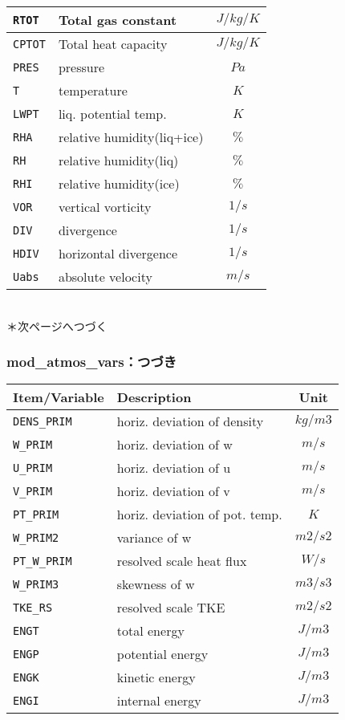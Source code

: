 \begin{tabularx}{150mm}{|l|X|c|}
  \verb|RTOT|   &  Total gas constant        & $J/kg/K$ \\\hline
  \verb|CPTOT|  &  Total heat capacity       & $J/kg/K$ \\\hline
  \verb|PRES|   &  pressure                  & $Pa$    \\\hline
  \verb|T|      &  temperature               & $K$     \\\hline
  \verb|LWPT|   &  liq. potential temp.      & $K$     \\\hline
  \verb|RHA|    &  relative humidity(liq+ice) & $\%$     \\\hline
  \verb|RH|     &  relative humidity(liq)     & $\%$     \\\hline
  \verb|RHI|    &  relative humidity(ice)     & $\%$     \\\hline
  \verb|VOR|    &  vertical vorticity        &  $1/s$   \\\hline
  \verb|DIV|    &  divergence                &  $1/s$   \\\hline
  \verb|HDIV|   &  horizontal divergence     &  $1/s$   \\\hline
  \verb|Uabs|   &  absolute velocity         &  $m/s$   \\\hline
 \end{tabularx}
　\\
\indent ＊次ページへつづく

\subsubsection{mod\_atmos\_vars：つづき}
 \begin{tabularx}{150mm}{|l|X|c|} \hline
 \rowcolor[gray]{0.9} Item/Variable & Description  & Unit \\ \hline
  \verb|DENS_PRIM| & horiz. deviation of density    & $kg/m3$ \\\hline
  \verb|W_PRIM|    & horiz. deviation of w          & $m/s$   \\\hline
  \verb|U_PRIM|    & horiz. deviation of u          & $m/s$   \\\hline
  \verb|V_PRIM|    & horiz. deviation of v          & $m/s$   \\\hline
  \verb|PT_PRIM|   & horiz. deviation of pot. temp. & $K$     \\\hline
  \verb|W_PRIM2|   & variance of w                  & $m2/s2$ \\\hline
  \verb|PT_W_PRIM| & resolved scale heat flux       & $W/s$   \\\hline
  \verb|W_PRIM3|   & skewness of w                  & $m3/s3$ \\\hline
  \verb|TKE_RS|    & resolved scale TKE             & $m2/s2$ \\\hline
  \verb|ENGT|      & total energy                   & $J/m3$  \\\hline
  \verb|ENGP|      & potential energy               & $J/m3$  \\\hline
  \verb|ENGK|      & kinetic energy                 & $J/m3$  \\\hline
  \verb|ENGI|      & internal energy                & $J/m3$  \\\hline
 \end{tabularx}

